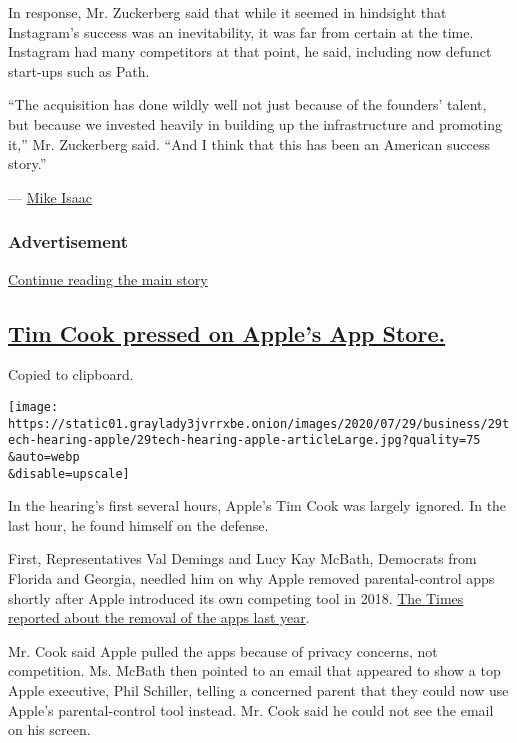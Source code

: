 In response, Mr. Zuckerberg said that while it seemed in hindsight that
Instagram's success was an inevitability, it was far from certain at the
time. Instagram had many competitors at that point, he said, including
now defunct start-ups such as Path.

``The acquisition has done wildly well not just because of the founders'
talent, but because we invested heavily in building up the
infrastructure and promoting it,'' Mr. Zuckerberg said. ``And I think
that this has been an American success story.''

--- \href{https://www.nytimes3xbfgragh.onion/by/mike-isaac}{Mike Isaac}

\hypertarget{advertisement-1}{%
\subsubsection{Advertisement}\label{advertisement-1}}

\protect\hyperlink{after-dfp-ad-mid2}{Continue reading the main story}

\hypertarget{tim-cook-pressed-on-apples-app-store}{%
\subsection{\texorpdfstring{\protect\hyperlink{tim-cook-pressed-on-apples-app-store}{Tim
Cook pressed on Apple's App
Store.}}{Tim Cook pressed on Apple's App Store.}}\label{tim-cook-pressed-on-apples-app-store}}

Copied to clipboard.

\texttt{[image: https://static01.graylady3jvrrxbe.onion/images/2020/07/29/business/29tech-hearing-apple/29tech-hearing-apple-articleLarge.jpg?quality=75\\\&auto=webp\\\&disable=upscale]}

In the hearing's first several hours, Apple's Tim Cook was largely
ignored. In the last hour, he found himself on the defense.

First, Representatives Val Demings and Lucy Kay McBath, Democrats from
Florida and Georgia, needled him on why Apple removed parental-control
apps shortly after Apple introduced its own competing tool in 2018.
\href{https://www.nytimes3xbfgragh.onion/2019/04/27/technology/apple-screen-time-trackers.html}{The
Times reported about the removal of the apps last year}.

Mr. Cook said Apple pulled the apps because of privacy concerns, not
competition. Ms. McBath then pointed to an email that appeared to show a
top Apple executive, Phil Schiller, telling a concerned parent that they
could now use Apple's parental-control tool instead. Mr. Cook said he
could not see the email on his screen.

